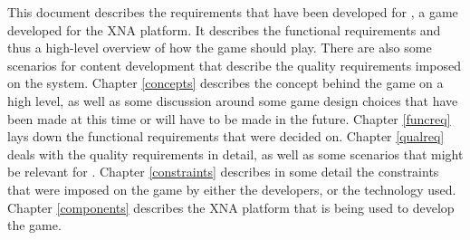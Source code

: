 This document describes the requirements that have been developed for \project,
a game developed for the XNA platform. It describes the functional requirements
and thus a high-level overview of how the game should play. There are also some
scenarios for content development that describe the quality requirements imposed
on the system. Chapter \ref{concepts} describes the concept behind the game on
a high level, as well as some discussion around some game design choices that
have been made at this time or will have to be made in the future. Chapter
\ref{funcreq} lays down the functional requirements that were decided on.
Chapter \ref{qualreq} deals with the quality requirements in detail, as well as
some scenarios that might be relevant for \project. Chapter \ref{constraints}
describes in some detail the constraints that were imposed on the game by either
the developers, or the technology used. Chapter \ref{components} describes
the XNA platform that is being used to develop the game.
